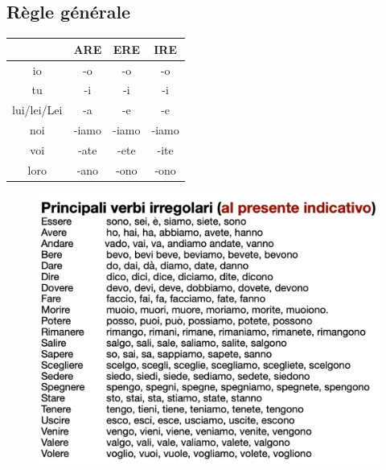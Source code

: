 \documentclass[12pt, openany]{report}
\begin{document}
\subsection{Règle générale}
\begin{minipage}{.49\textwidth}
    \vspace{.75cm}
    \begin{center}
        \begin{tabular}{c||c|c|c}
            & ARE & ERE & IRE\\
            \hline
            io & -o & -o & -o\\
            tu & -i & -i & -i\\
            lui/lei/Lei & -a & -e & -e\\
            noi & -iamo & -iamo & -iamo\\
            voi & -ate & -ete & -ite\\
            loro & -ano & -ono & -ono\\
        \end{tabular}
    \end{center}
\end{minipage}
\begin{minipage}{.5\textwidth}
    \centering 
    \begin{figure}[H]
        \includegraphics[width = \textwidth]{img/irregolari_presente.png}
    \end{figure}
\end{minipage}\\
\end{document}
